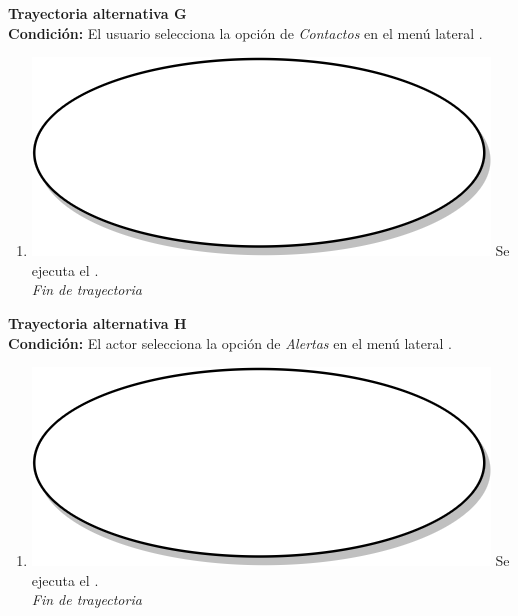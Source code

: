 \textbf{Trayectoria alternativa G} \label{cu3_ta_g} \\
\textbf{Condición:} El usuario selecciona la opción de \textit{Contactos} en el menú lateral \textbf{}. \\
 \begin{enumerate}[label=G\arabic*]
    \item {\includegraphics[scale=.05]{Capitulo3/img/proceso.png} Se ejecuta el \textbf{}.} \\
    \textit{Fin de trayectoria} \\
\end{enumerate}

\textbf{Trayectoria alternativa H} \label{cu3_ta_h} \\
\textbf{Condición:} El actor selecciona la opción de \textit{Alertas} en el menú lateral \textbf{}. \\
 \begin{enumerate}[label=H\arabic*]
    \item {\includegraphics[scale=.05]{Capitulo3/img/proceso.png} Se ejecuta el \textbf{}.} \\
    \textit{Fin de trayectoria} \\
\end{enumerate}

